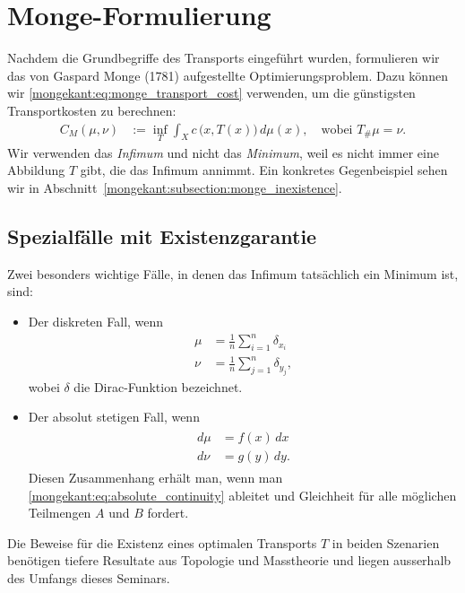 %
%
%
%
\section{Monge-Formulierung%
\label{mongekant:section:teil1}}

Nachdem die Grundbegriffe des Transports eingeführt wurden,
formulieren wir das von Gaspard Monge (1781) aufgestellte Optimierungsproblem.
%
Dazu können wir \eqref{mongekant:eq:monge_transport_cost} verwenden,
um die günstigsten Transportkosten zu berechnen:
%
\begin{align}
C_M(\mu, \nu)
&:=
\inf_{T}
\int_X c\,\bigl(x, T(x)\bigr)\, d\mu(x)
,\quad
\text{wobei } T_{\#}\mu=\nu
.
\label{mongekant:eq:monge_problem}
\end{align}
Wir verwenden das \emph{Infimum} und nicht das \emph{Minimum},
%
%
weil es nicht immer eine Abbildung $T$ gibt,
die das Infimum annimmt.
Ein konkretes Gegenbeispiel sehen wir in
Abschnitt~\ref{mongekant:subsection:monge_inexistence}.

\subsection{Spezialfälle mit Existenzgarantie}
Zwei besonders wichtige Fälle,
in denen das Infimum tatsächlich ein Minimum ist,
sind:
\begin{itemize}
\item Der diskreten Fall, wenn
\begin{align*}
\mu
&=
\frac{1}{n} \sum_{i=1}^n \delta_{x_i}
\\
\nu
&=
\frac{1}{n} \sum_{j=1}^n \delta_{y_j}
,
\end{align*}
wobei $\delta$ die Dirac-Funktion bezeichnet.
\item Der absolut stetigen Fall, wenn
\begin{align}
\begin{aligned}
d\mu
&=
f(x)\, dx
\\
d\nu
&=
g(y)\, dy
.
\end{aligned}
\label{mongekant:eq:absolute_densities}
\end{align}
Diesen Zusammenhang erhält man,
wenn man \eqref{mongekant:eq:absolute_continuity} ableitet und
Gleichheit für alle möglichen Teilmengen $A$ und $B$ fordert.
\end{itemize}
Die Beweise für die Existenz eines optimalen Transports $T$ in beiden Szenarien
benötigen tiefere Resultate aus Topologie und Masstheorie und
%
%
liegen ausserhalb des Umfangs dieses Seminars.

